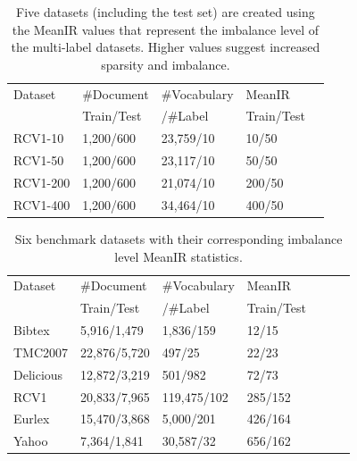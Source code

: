 \documentclass[letterpaper]{article} %
\begin{document}
\begin{table}[!t]
  \centering
  \begin{tabular}{lllll}
    \toprule
  Dataset     & \#Document   & \#Vocabulary  & MeanIR \\
             & Train/Test   & /\#Label  & Train/Test \\
    \midrule
    RCV1-10     & 1,200/600 & 23,759/10  & 10/50 \\
    RCV1-50      & 1,200/600 & 23,117/10  & 50/50\\
   RCV1-200      & 1,200/600 & 21,074/10  & 200/50 \\
   RCV1-400      & 1,200/600 & 34,464/10 & 400/50 \\
    \bottomrule
  \end{tabular}
    \caption{Five datasets (including the test set) are created using the MeanIR values that represent the imbalance level of the multi-label datasets. Higher values suggest increased sparsity and imbalance.}
  \label{tab:syndataset-table}
\end{table}
\begin{table}[!tb]
  \centering
  \begin{tabular}{lllllll}
    \toprule

    Dataset     & \#Document   & \#Vocabulary    & MeanIR \\
             & Train/Test   & /\#Label & Train/Test \\
    \midrule
      Bibtex     & 5,916/1,479 & 1,836/159  & 12/15 \\
    TMC2007   & 22,876/5,720 & 497/25  & 22/23 \\
      Delicious     & 12,872/3,219 & 501/982  & 72/73 \\
    RCV1     & 20,833/7,965 & 119,475/102  & 285/152 \\
    Eurlex  & 15,470/3,868 & 5,000/201  &  426/164 \\
    Yahoo   & 7,364/1,841 & 30,587/32  & 656/162 \\

    \bottomrule
  \end{tabular}
    \caption{Six benchmark datasets with their corresponding imbalance level MeanIR statistics. }
  \label{tab:dataset-table}
\end{table}
\end{document}
